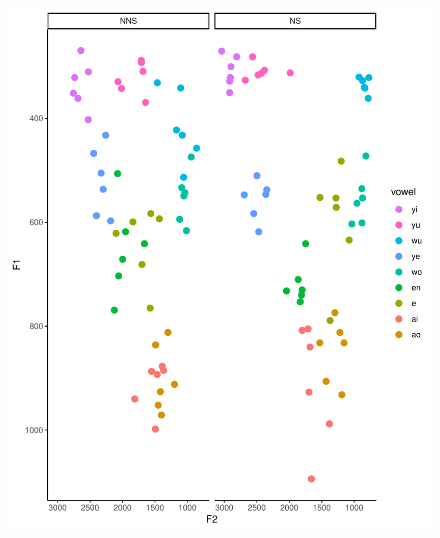 \documentclass[man, fleqn, noextraspace]{apa6}
\begin{document}
\begin{figure}
\centering
\includegraphics{Vowel_v2_files/figure-latex/figure4-1.pdf}
\caption{}
\end{figure}
\end{document}
